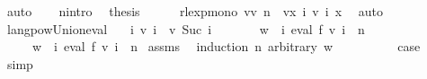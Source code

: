 \begin{isabellebody}
\ auto\isanewline
\ \ \isamarkupfalse%
\ n{\isacharunderscore}{\kern0pt}intro\ \isamarkupfalse%
\ {\isachardoublequoteopen}{\isacharquery}{\kern0pt}thesis{\isachardoublequoteclose}\isanewline
\ \ \ \ \isamarkupfalse%
\ rlexp{\isacharunderscore}{\kern0pt}mono{\isacharbrackleft}{\kern0pt}\ v{\isacharequal}{\kern0pt}{\isachardoublequoteopen}v\ n{\isachardoublequoteclose}\ \ v{\isacharprime}{\kern0pt}{\isacharequal}{\kern0pt}{\isachardoublequoteopen}{\isasymlambda}x{\isachardot}{\kern0pt}\ {\isasymUnion}i{\isachardot}{\kern0pt}\ v\ i\ x{\isachardoublequoteclose}{\isacharbrackright}{\kern0pt}\ \isamarkupfalse%
\ auto\isanewline
{}\isamarkupfalse%
%
\endisatagproof
{\isafoldproof}%
%
\isadelimproof
\isanewline
%
\endisadelimproof
\isanewline
{}\isamarkupfalse%
\ langpow{\isacharunderscore}{\kern0pt}Union{\isacharunderscore}{\kern0pt}eval{\isacharcolon}{\kern0pt}\isanewline
\ \ \ {\isachardoublequoteopen}{\isasymforall}i{\isachardot}{\kern0pt}\ v\ i\ {\isasymle}\ v\ {\isacharparenleft}{\kern0pt}Suc\ i{\isacharparenright}{\kern0pt}{\isachardoublequoteclose}\isanewline
\ \ \ \ \ \ \ {\isachardoublequoteopen}w\ {\isasymin}\ {\isacharparenleft}{\kern0pt}{\isasymUnion}i{\isachardot}{\kern0pt}\ eval\ f\ {\isacharparenleft}{\kern0pt}v\ i{\isacharparenright}{\kern0pt}{\isacharparenright}{\kern0pt}\ {\isacharcircum}{\kern0pt}{\isacharcircum}{\kern0pt}\ n{\isachardoublequoteclose}\isanewline
\ \ \ \ \ {\isachardoublequoteopen}w\ {\isasymin}\ {\isacharparenleft}{\kern0pt}{\isasymUnion}i{\isachardot}{\kern0pt}\ eval\ f\ {\isacharparenleft}{\kern0pt}v\ i{\isacharparenright}{\kern0pt}\ {\isacharcircum}{\kern0pt}{\isacharcircum}{\kern0pt}\ n{\isacharparenright}{\kern0pt}{\isachardoublequoteclose}\isanewline
%
\isadelimproof
%
\endisadelimproof
%
\isatagproof
{}\isamarkupfalse%
\ assms{\isacharparenleft}{\kern0pt}{}{\isacharparenright}{\kern0pt}\ \isamarkupfalse%
\ {\isacharparenleft}{\kern0pt}induction\ n\ arbitrary{\isacharcolon}{\kern0pt}\ w{\isacharparenright}{\kern0pt}\isanewline
\ \ \isamarkupfalse%
\ {}\isanewline
\ \ \isamarkupfalse%
\ \isamarkupfalse%
\ {\isacharquery}{\kern0pt}case\ \isamarkupfalse%
\ simp\isanewline
{}\isamarkupfalse%
\isanewline
\ \ \isamarkupfalse%

\end{isabellebody}
